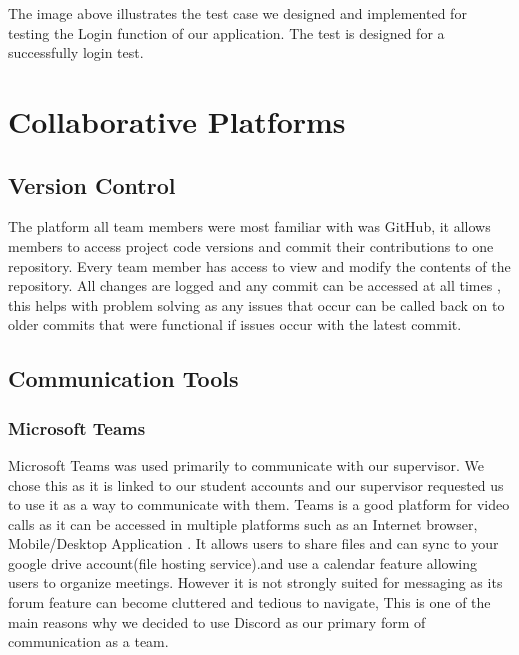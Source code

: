 The image above illustrates the test case we designed and implemented for testing the Login function of our application. The test is designed for a successfully login test.
\section{Collaborative Platforms}
\subsection{Version Control}
The platform all team members were most familiar with was GitHub, it allows members to access project code versions and commit their contributions to one repository. Every team member has access to view and modify the contents of the repository. All changes are logged and any commit can be accessed at all times , this helps with problem solving as any issues that occur can be called back on to older commits that were functional if issues occur with the latest commit.

\subsection{Communication Tools}
\subsubsection{Microsoft Teams}
Microsoft Teams was used primarily to communicate with our supervisor. We chose this as it is linked to our student accounts and our supervisor requested us to use it as a way to communicate with them.
\newline Teams is a good platform for video calls as it can be accessed in multiple platforms such as an Internet browser, Mobile/Desktop Application . It allows users to share files and can sync to your google drive account(file hosting service).and use a calendar feature allowing users to organize meetings.
\newline
However it is not strongly suited for messaging as its forum feature can become cluttered and tedious to navigate,
This is one of the main reasons why we decided to use Discord as our primary form of communication as a team.
